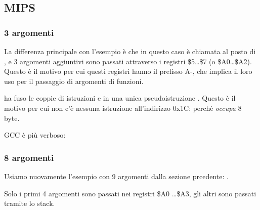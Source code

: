 \subsection{MIPS}

\subsubsection{3 argomenti}


La differenza principale con l'esempio \q{\HelloWorldSectionName} è che in questo caso \printf è chiamata 
al posto di \puts, e 3 argomenti aggiuntivi sono passati attraverso i registri \$5\dots \$7 (o \$A0\dots \$A2).
Questo è il motivo per cui questi registri hanno il prefisso A-, che implica il loro uso per il passaggio di argomenti di funzioni.





\IDA ha fuso le coppie di istruzioni  e  in una unica pseudoistruzione .
Questo è il motivo per cui non c'è nessuna istruzione all'indirizzo 0x1C: perchè  \emph{occupa} 8 byte.%


\NonOptimizing GCC è più verboso:





\subsubsection{8 argomenti}

Usiamo nuovamente l'esempio con 9 argomenti dalla sezione prcedente: .




Solo i primi 4 argomenti sono passati nei registri \$A0 \dots \$A3, gli altri sono passati tramite lo stack.

